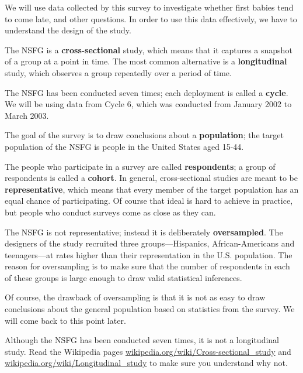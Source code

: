 \documentclass[12pt]{book}
\begin{document}
We will use data collected by this survey to investigate whether first
babies tend to come late, and other questions.  In order to use this
data effectively, we have to understand the design of the study.

The NSFG is a {\bf cross-sectional} study, which means that it
captures a snapshot of a group at a point in time.  The most
common alternative is a {\bf longitudinal} study, which observes a
group repeatedly over a period of time.

The NSFG has been conducted seven times; each deployment is called
a {\bf cycle}.  We will be using data from Cycle 6, which was
conducted from January 2002 to March 2003.

The goal of the survey is to draw conclusions about a
{\bf population}; the target population of the NSFG is people in
the United States aged 15-44.

The people who participate in a survey are called {\bf respondents};
a group of respondents is called a {\bf cohort}.
In general, cross-sectional studies are meant to be {\bf
  representative}, which means that every member of the target
population has an equal chance of participating.  Of course that ideal
is hard to achieve in practice, but people who conduct surveys come as
close as they can.

The NSFG is not representative; instead it is deliberately {\bf
  oversampled}.  The designers of the study recruited three
groups---Hispanics, African-Americans and teenagers---at rates higher
than their representation in the U.S. population.
The reason for oversampling is to make sure that the number of
respondents in each of these groups is large enough to draw valid
statistical inferences.

Of course, the drawback of oversampling is that it is not as easy
to draw conclusions about the general population based on statistics
from the survey.  We will come back to this point later.

\begin{exercise}
Although the NSFG has been conducted seven times, it is not a
longitudinal study.  Read the Wikipedia pages
\url{wikipedia.org/wiki/Cross-sectional_study}
and
\url{wikipedia.org/wiki/Longitudinal_study}
to make sure you understand why not.

\end{exercise}
\end{document}
